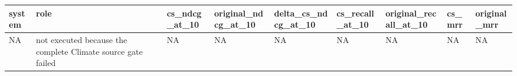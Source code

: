 \begin{tabular}{lllllllll}
\toprule
system & role & cs\_ndcg\_at\_10 & original\_ndcg\_at\_10 & delta\_cs\_ndcg\_at\_10 & cs\_recall\_at\_10 & original\_recall\_at\_10 & cs\_mrr & original\_mrr \\
\midrule
NA & not executed because the complete Climate source gate failed & NA & NA & NA & NA & NA & NA & NA \\
\bottomrule
\end{tabular}
